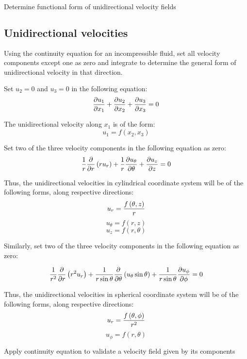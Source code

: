 
\begin {lo3} 
Determine functional form of unidirectional velocity fields
\end {lo3}

\subsection{Unidirectional velocities}

Using the continuity equation for an incompressible fluid, set all velocity components except one as zero and integrate to determine the general form of unidirectional velocity in that direction.

Set $u_2=0$ and $u_3=0$ in the following equation:
$$ {\partial u_1 \over \partial x_1} + {\partial u_2 \over \partial x_2} + {\partial u_3 \over \partial x_3} = 0 $$

The unidirectional velocity along $x_1$ is of the form:
	$$ u_1 = f\left(x_2, x_3 \right) $$

Set two of the three velocity components in the following equation as zero:
$$ {1 \over r} {\partial \over \partial r} \left( r u_r \right) + {1 \over r} {\partial u_\theta \over \partial \theta} + {\partial u_z \over \partial z} = 0 $$

Thus, the unidirectional velocities in cylindrical coordinate system will be of the following forms, along respective directions:
	$$ u_r = {f\left(\theta,z\right) \over r} $$
	$$ u_\theta = f\left(r, z \right) $$
	$$ u_z = f\left(r, \theta \right) $$


Similarly, set two of the three velocity components in the following equation as zero:

$$ {1 \over r^2} {\partial \over \partial r} \left( r^2 u_r \right) + {1 \over r \sin\theta} {\partial \over \partial \theta} \left( u_\theta \sin\theta \right) + {1 \over r \sin\theta} {\partial u_\phi \over \partial \phi} = 0 $$

Thus, the unidirectional velocities in spherical coordinate system will be of the following forms, along respective directions:
	$$ u_r = {f\left(\theta,\phi\right) \over r^2} $$
	$$ u_\phi = f\left(r, \theta \right) $$


\begin {lo3} 
Apply continuity equation to validate a velocity field given by its components
\end {lo3}


